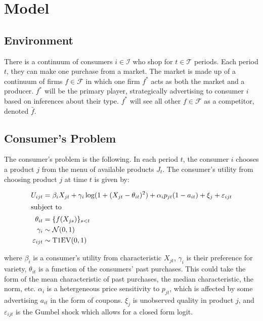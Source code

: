 \documentclass[12pt]{article}
\begin{document}
\section{Model}

    \subsection{Environment}
    There is a continuum of consumers $i\in\mathcal{I}$ who shop for $t\in\mathcal{T}$ periods. Each period $t$, they can make one purchase from a market. The market is made up of a continuum of firms $f\in\mathcal{F}$ in which one firm $f^*$ acts as both the market and a producer. $f^*$ will be the primary player, strategically advertising to consumer $i$ based on inferences about their type. $f^*$ will see all other $f\in\mathcal{F}$ as a competitor, denoted $\bar{f}$.


    \subsection{Consumer's Problem}
    The consumer's problem is the following. In each period $t$, the consumer $i$ chooses a product $j$ from the menu of available products $J_t$. The consumer's utility from choosing product $j$ at time $t$ is given by:

    \begin{alignat*}{1}
        U_{ijt} &= \beta_i X_{jt} + \gamma_i \log(1 + (X_{jt} - \theta_{it})^2) 
                  + \alpha_i p_{jt}(1 - a_{it}) + \xi_j + \varepsilon_{ijt} \\
    \shortintertext{subject to}
        \theta_{it} &= \{f(X_{js})\}_{s < t} \\
        \gamma_i &\sim \mathcal{N}(0, 1)\\ \varepsilon_{ijt} &\sim \text{T1EV}(0,1)
    \end{alignat*}

    where $\beta_i$ is a consumer's utility from characteristic $X_{jt}$, $\gamma_i$ is their preference for variety, $\theta_{it}$ is a function of the consumers' past purchases. This could take the form of the mean characteristic of past purchases, the median characteristic, the norm, etc. $\alpha_i$ is a hetergeneous price sensitivity to $p_{jt}$, which is affected by some advertising $a_{it}$ in the form of coupons. $\xi_j$ is unobserved quality in product $j$, and $\varepsilon_{ijt}$ is the Gumbel shock which allows for a closed form logit.
\end{document}
